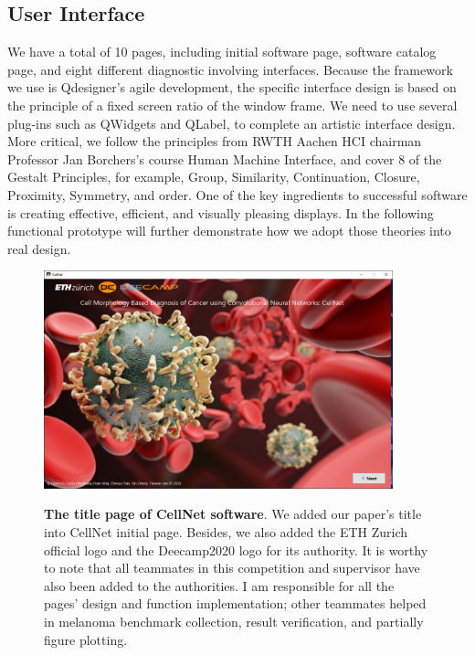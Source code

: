 \subsection{User Interface} %
\label{sub:amet}
We have a total of 10 pages, including initial software page, software catalog page, and eight different diagnostic involving interfaces. Because the framework we use is Qdesigner's agile development, the specific interface design is based on the principle of a fixed screen ratio of the window frame. We need to use several plug-ins such as QWidgets and QLabel, to complete an artistic interface design. More critical, we follow the principles from RWTH Aachen HCI chairman Professor Jan Borchers's course Human Machine Interface, and cover 8 of the Gestalt Principles, for example, Group, Similarity, Continuation, Closure, Proximity, Symmetry, and order. One of the key ingredients to successful software is creating effective, efficient, and visually pleasing displays. In the following functional prototype will further demonstrate how we adopt those theories into real design.

\begin{figure}[t]
\begin{center}
\includegraphics[height=0.3\textheight,width=0.9\textwidth]{thesis-template-master/images/cellnet1page.PNG}
\label{fig:cellnet}
\end{center}
\caption{ \textbf{The title page of CellNet software}. We added our paper's title into CellNet initial page. Besides, we also added the ETH Zurich official logo and the Deecamp2020 logo for its authority. It is worthy to note that all teammates in this competition and  supervisor have also been added to the authorities. I am responsible for all the pages' design and function implementation; other teammates helped in melanoma benchmark collection, result verification, and partially figure plotting.}
\label{fig:6.10}
\end{figure}


